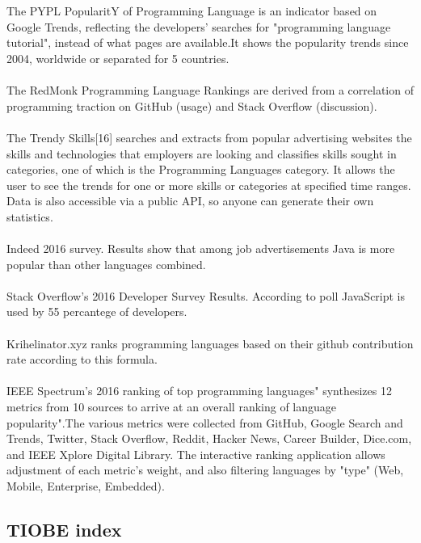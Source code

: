 \documentclass[a4paper, 12pt]{report}
\begin{document}
\\ \\The PYPL PopularitY of Programming Language is an indicator based on Google Trends, reflecting the developers' searches 
for "programming language tutorial", instead of what pages are available.It shows the popularity trends since 2004, 
worldwide or separated for 5 countries.
\\ \\The RedMonk Programming Language Rankings are derived from a correlation of programming traction on GitHub (usage) 
and Stack Overflow (discussion).
\\ \\ The Trendy Skills[16] searches and extracts from popular advertising websites the skills and technologies that employers are 
looking and classifies skills sought in categories, one of which is the Programming Languages category. It allows the user to 
see the trends for one or more skills or categories at specified time ranges. Data is also accessible via a public API, so anyone 
can generate their own statistics.
\\ \\Indeed 2016 survey. Results show that among job advertisements Java is more popular than other languages combined.
\\ \\Stack Overflow's 2016 Developer Survey Results. According to poll JavaScript is used by 55 percantege of developers.
\\ \\ Krihelinator.xyz ranks programming languages based on their github contribution rate according to this formula.
\\ \\IEEE Spectrum's 2016 ranking of top programming languages"
synthesizes 12 metrics from 10 sources to arrive at an 
overall ranking of language popularity".The various metrics were collected from GitHub, Google 
Search and Trends, Twitter, Stack Overflow, Reddit, Hacker News, Career Builder, Dice.com, and IEEE Xplore Digital 
Library. The interactive ranking application allows adjustment of each metric's weight, and also filtering languages by "type" 
(Web, Mobile, Enterprise, Embedded).
\begin{center}
\chapter{TIOBE index} \\
\end{center}
\end{document}

